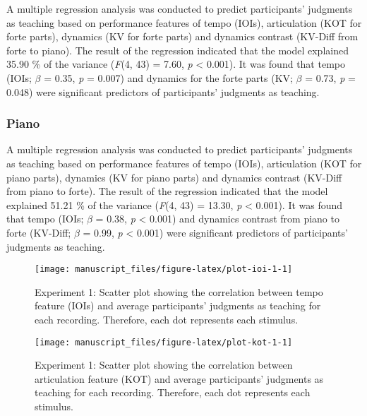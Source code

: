 \documentclass[
  man,floatsintext]{apa6}
\begin{document}
A multiple regression analysis was conducted to predict participants' judgments as teaching based on performance features of tempo (IOIs), articulation (KOT for forte parts), dynamics (KV for forte parts) and dynamics contrast (KV-Diff from forte to piano). The result of the regression indicated that the model explained 35.90 \% of the variance (\emph{F}(4, 43) = 7.60, \emph{p} \textless{} 0.001). It was found that tempo (IOIs; \emph{\(\beta\)} = 0.35, \emph{p} = 0.007) and dynamics for the forte parts (KV; \emph{\(\beta\)} = 0.73, \emph{p} = 0.048) were significant predictors of participants' judgments as teaching.

\hypertarget{piano}{%
\subsubsection{Piano}\label{piano}}

A multiple regression analysis was conducted to predict participants' judgments as teaching based on performance features of tempo (IOIs), articulation (KOT for piano parts), dynamics (KV for piano parts) and dynamics contrast (KV-Diff from piano to forte). The result of the regression indicated that the model explained 51.21 \% of the variance (\emph{F}(4, 43) = 13.30, \emph{p} \textless{} 0.001). It was found that tempo (IOIs; \emph{\(\beta\)} = 0.38, \emph{p} \textless{} 0.001) and dynamics contrast from piano to forte (KV-Diff; \emph{\(\beta\)} = 0.99, \emph{p} \textless{} 0.001) were significant predictors of participants' judgments as teaching.

\begin{figure}

{\centering \texttt{[image: manuscript\_files/figure-latex/plot-ioi-1-1]} 

}

\caption{\label{fig:ioi-1}Experiment 1: Scatter plot showing the correlation between tempo feature (IOIs) and average participants' judgments as teaching for each recording. Therefore, each dot represents each stimulus.}\label{fig:plot-ioi-1}
\end{figure}

\begin{figure}

{\centering \texttt{[image: manuscript\_files/figure-latex/plot-kot-1-1]} 

}

\caption{\label{fig:kot-1}Experiment 1: Scatter plot showing the correlation between articulation feature (KOT) and average participants' judgments as teaching for each recording. Therefore, each dot represents each stimulus.}\label{fig:plot-kot-1}
\end{figure}
\end{document}
